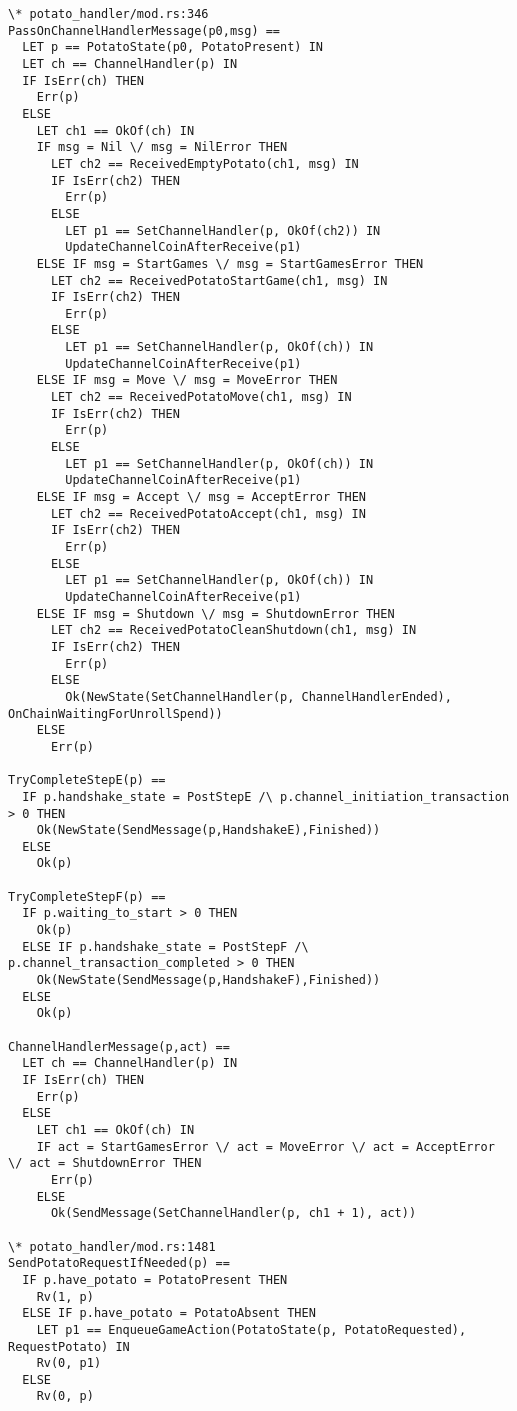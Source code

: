 \documentclass[a4paper]{article}
\begin{document}
\begin{multicols}{2}
\begin{verbatim}
\* potato_handler/mod.rs:346
PassOnChannelHandlerMessage(p0,msg) ==
  LET p == PotatoState(p0, PotatoPresent) IN
  LET ch == ChannelHandler(p) IN
  IF IsErr(ch) THEN
    Err(p)
  ELSE
    LET ch1 == OkOf(ch) IN
    IF msg = Nil \/ msg = NilError THEN
      LET ch2 == ReceivedEmptyPotato(ch1, msg) IN
      IF IsErr(ch2) THEN
        Err(p)
      ELSE
        LET p1 == SetChannelHandler(p, OkOf(ch2)) IN
        UpdateChannelCoinAfterReceive(p1)
    ELSE IF msg = StartGames \/ msg = StartGamesError THEN
      LET ch2 == ReceivedPotatoStartGame(ch1, msg) IN
      IF IsErr(ch2) THEN
        Err(p)
      ELSE
        LET p1 == SetChannelHandler(p, OkOf(ch)) IN
        UpdateChannelCoinAfterReceive(p1)
    ELSE IF msg = Move \/ msg = MoveError THEN
      LET ch2 == ReceivedPotatoMove(ch1, msg) IN
      IF IsErr(ch2) THEN
        Err(p)
      ELSE
        LET p1 == SetChannelHandler(p, OkOf(ch)) IN
        UpdateChannelCoinAfterReceive(p1)
    ELSE IF msg = Accept \/ msg = AcceptError THEN
      LET ch2 == ReceivedPotatoAccept(ch1, msg) IN
      IF IsErr(ch2) THEN
        Err(p)
      ELSE
        LET p1 == SetChannelHandler(p, OkOf(ch)) IN
        UpdateChannelCoinAfterReceive(p1)
    ELSE IF msg = Shutdown \/ msg = ShutdownError THEN
      LET ch2 == ReceivedPotatoCleanShutdown(ch1, msg) IN
      IF IsErr(ch2) THEN
        Err(p)
      ELSE
        Ok(NewState(SetChannelHandler(p, ChannelHandlerEnded), OnChainWaitingForUnrollSpend))
    ELSE
      Err(p)

TryCompleteStepE(p) ==
  IF p.handshake_state = PostStepE /\ p.channel_initiation_transaction > 0 THEN
    Ok(NewState(SendMessage(p,HandshakeE),Finished))
  ELSE
    Ok(p)

TryCompleteStepF(p) ==
  IF p.waiting_to_start > 0 THEN
    Ok(p)
  ELSE IF p.handshake_state = PostStepF /\ p.channel_transaction_completed > 0 THEN
    Ok(NewState(SendMessage(p,HandshakeF),Finished))
  ELSE
    Ok(p)

ChannelHandlerMessage(p,act) ==
  LET ch == ChannelHandler(p) IN
  IF IsErr(ch) THEN
    Err(p)
  ELSE
    LET ch1 == OkOf(ch) IN
    IF act = StartGamesError \/ act = MoveError \/ act = AcceptError \/ act = ShutdownError THEN
      Err(p)
    ELSE
      Ok(SendMessage(SetChannelHandler(p, ch1 + 1), act))

\* potato_handler/mod.rs:1481
SendPotatoRequestIfNeeded(p) ==
  IF p.have_potato = PotatoPresent THEN
    Rv(1, p)
  ELSE IF p.have_potato = PotatoAbsent THEN
    LET p1 == EnqueueGameAction(PotatoState(p, PotatoRequested), RequestPotato) IN
    Rv(0, p1)
  ELSE
    Rv(0, p)


\end{verbatim}
\end{multicols}
\end{document}
